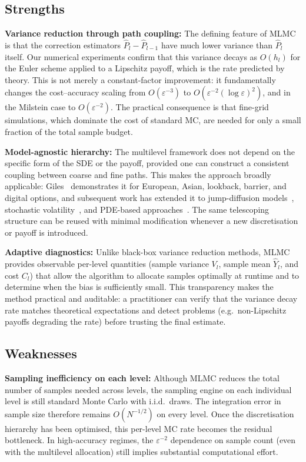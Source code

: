 \documentclass[11pt]{article}
\begin{document}
\subsection{Strengths}

\textbf{Variance reduction through path coupling:}
The defining feature of MLMC is that the correction estimators $\hat{P}_{l} - \hat{P}_{l-1}$ have much lower variance than $\hat{P}_{l}$ itself. Our numerical experiments confirm that this variance decays as $O(h_{l})$ for the Euler scheme applied to a Lipschitz payoff, which is the rate predicted by theory. This is not merely a constant-factor improvement: it fundamentally changes the cost--accuracy scaling from $O(\varepsilon^{-3})$ to $O(\varepsilon^{-2}(\log\varepsilon)^{2})$, and in the Milstein case to $O(\varepsilon^{-2})$. The practical consequence is that fine-grid simulations, which dominate the cost of standard MC, are needed for only a small fraction of the total sample budget.

\textbf{Model-agnostic hierarchy:}
The multilevel framework does not depend on the specific form of the SDE or the payoff, provided one can construct a consistent coupling between coarse and fine paths. This makes the approach broadly applicable: Giles~\cite{giles2008} demonstrates it for European, Asian, lookback, barrier, and digital options, and subsequent work has extended it to jump-diffusion models~\cite{xia2012}, stochastic volatility~\cite{giles2015}, and PDE-based approaches~\cite{cliffe2011}. The same telescoping structure can be reused with minimal modification whenever a new discretisation or payoff is introduced.

\textbf{Adaptive diagnostics:}
Unlike black-box variance reduction methods, MLMC provides observable per-level quantities (sample variance $V_{l}$, sample mean $\hat{Y}_{l}$, and cost $C_{l}$) that allow the algorithm to allocate samples optimally at runtime and to determine when the bias is sufficiently small. This transparency makes the method practical and auditable: a practitioner can verify that the variance decay rate matches theoretical expectations and detect problems (e.g.\ non-Lipschitz payoffs degrading the rate) before trusting the final estimate.

\subsection{Weaknesses}

\textbf{Sampling inefficiency on each level:}
Although MLMC reduces the total number of samples needed across levels, the sampling engine on each individual level is still standard Monte Carlo with i.i.d.\ draws. The integration error in sample size therefore remains $O(N^{-1/2})$ on every level. Once the discretisation hierarchy has been optimised, this per-level MC rate becomes the residual bottleneck. In high-accuracy regimes, the $\varepsilon^{-2}$ dependence on sample count (even with the multilevel allocation) still implies substantial computational effort.
\end{document}

